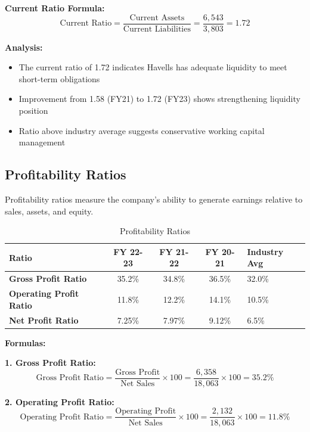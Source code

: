 \documentclass[12pt,a4paper]{article}
\begin{document}
\textbf{Current Ratio Formula:}
\[
\text{Current Ratio} = \frac{\text{Current Assets}}{\text{Current Liabilities}} = \frac{6,543}{3,803} = 1.72
\]

\textbf{Analysis:}
\begin{itemize}
    \item The current ratio of 1.72 indicates Havells has adequate liquidity to meet short-term obligations
    \item Improvement from 1.58 (FY21) to 1.72 (FY23) shows strengthening liquidity position
    \item Ratio above industry average suggests conservative working capital management
\end{itemize}

\subsection{Profitability Ratios}

Profitability ratios measure the company's ability to generate earnings relative to sales, assets, and equity.

\begin{table}[H]
    \centering
    \caption{Profitability Ratios}
    \begin{tabular}{|l|c|c|c|l|}
        \hline
        \textbf{Ratio} & \textbf{FY 22-23} & \textbf{FY 21-22} & \textbf{FY 20-21} & \textbf{Industry Avg} \\
        \hline
        \textbf{Gross Profit Ratio} & 35.2\% & 34.8\% & 36.5\% & 32.0\% \\
        \hline
        \textbf{Operating Profit Ratio} & 11.8\% & 12.2\% & 14.1\% & 10.5\% \\
        \hline
        \textbf{Net Profit Ratio} & 7.25\% & 7.97\% & 9.12\% & 6.5\% \\
        \hline
    \end{tabular}
\end{table}

\textbf{Formulas:}

\textbf{1. Gross Profit Ratio:}
\[
\text{Gross Profit Ratio} = \frac{\text{Gross Profit}}{\text{Net Sales}} \times 100 = \frac{6,358}{18,063} \times 100 = 35.2\%
\]

\textbf{2. Operating Profit Ratio:}
\[
\text{Operating Profit Ratio} = \frac{\text{Operating Profit}}{\text{Net Sales}} \times 100 = \frac{2,132}{18,063} \times 100 = 11.8\%
\]
\end{document}
